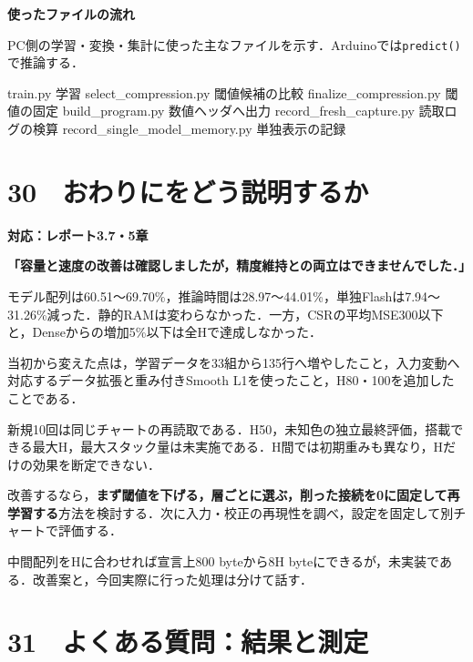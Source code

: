 \documentclass[
  14pt,
  a5paper,
]{extarticle}
\newenvironment{Shaded}{}{}
\newcommand{\NormalTok}[1]{#1}
\begin{document}
\textbf{使ったファイルの流れ}

PC側の学習・変換・集計に使った主なファイルを示す．Arduinoでは\texttt{predict()}で推論する．

\begin{Shaded}
\begin{Highlighting}[]
\NormalTok{train.py                      学習}
\NormalTok{select\_compression.py         閾値候補の比較}
\NormalTok{finalize\_compression.py       閾値の固定}
\NormalTok{build\_program.py              数値ヘッダへ出力}
\NormalTok{record\_fresh\_capture.py       読取ログの検算}
\NormalTok{record\_single\_model\_memory.py 単独表示の記録}
\end{Highlighting}
\end{Shaded}

\newpage

\section{30　おわりにをどう説明するか}\label{ux304aux308fux308aux306bux3092ux3069ux3046ux8aacux660eux3059ux308bux304b}

\textbf{対応：レポート3.7・5章}

\textbf{「容量と速度の改善は確認しましたが，精度維持との両立はできませんでした．」}

モデル配列は60.51〜69.70\%，推論時間は28.97〜44.01\%，単独Flashは7.94〜31.26\%減った．静的RAMは変わらなかった．一方，CSRの平均MSE300以下と，Denseからの増加5\%以下は全Hで達成しなかった．

当初から変えた点は，学習データを33組から135行へ増やしたこと，入力変動へ対応するデータ拡張と重み付きSmooth
L1を使ったこと，H80・100を追加したことである．

新規10回は同じチャートの再読取である．H50，未知色の独立最終評価，搭載できる最大H，最大スタック量は未実施である．H間では初期重みも異なり，Hだけの効果を断定できない．

改善するなら，\textbf{まず閾値を下げる，層ごとに選ぶ，削った接続を0に固定して再学習する}方法を検討する．次に入力・校正の再現性を調べ，設定を固定して別チャートで評価する．

中間配列をHに合わせれば宣言上800 byteから8H
byteにできるが，未実装である．改善案と，今回実際に行った処理は分けて話す．

\newpage

\section{31　よくある質問：結果と測定}\label{ux3088ux304fux3042ux308bux8ceaux554fux7d50ux679cux3068ux6e2cux5b9a}
\end{document}
